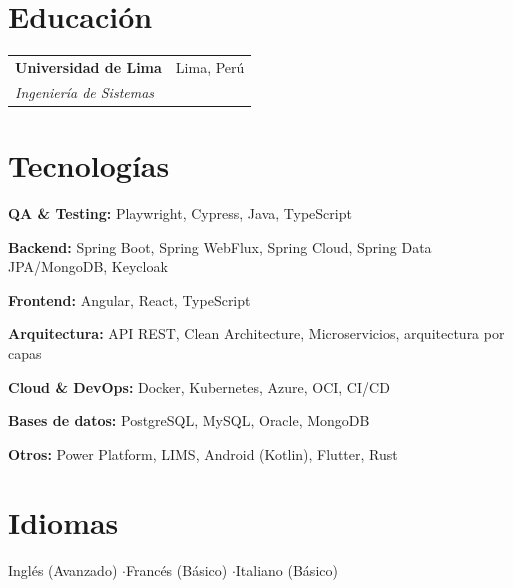 \documentclass[10pt, a4paper]{article}
\newcommand{\cvrow}[2]{%
    {\small\textbf{#1:} #2}\par\vspace{1pt}%
}
\begin{document}
\section{Educación}
\begin{tabularx}{\linewidth}{@{}Xr@{}}
    {\small\textbf{Universidad de Lima}} & {\footnotesize\textcolor{subtle}{Lima, Perú}} \\[-1pt]
    {\footnotesize\textit{\textcolor{subtle}{Ingeniería de Sistemas}}} & \\
\end{tabularx}

\vspace{1pt}

\section{Tecnologías}

\cvrow{QA \& Testing}{Playwright, Cypress, Java, TypeScript}
\cvrow{Backend}{Spring Boot, Spring WebFlux, Spring Cloud, Spring Data JPA/MongoDB, Keycloak}
\cvrow{Frontend}{Angular, React, TypeScript}
\cvrow{Arquitectura}{API REST, Clean Architecture, Microservicios, arquitectura por capas}
\cvrow{Cloud \& DevOps}{Docker, Kubernetes, Azure, OCI, CI/CD}
\cvrow{Bases de datos}{PostgreSQL, MySQL, Oracle, MongoDB}
\cvrow{Otros}{Power Platform, LIMS, Android (Kotlin), Flutter, Rust}

\section{Idiomas}
{\small Inglés (Avanzado) \quad\textcolor{subtle}{$\cdot$}\quad Francés (Básico) \quad\textcolor{subtle}{$\cdot$}\quad Italiano (Básico)}
\end{document}
